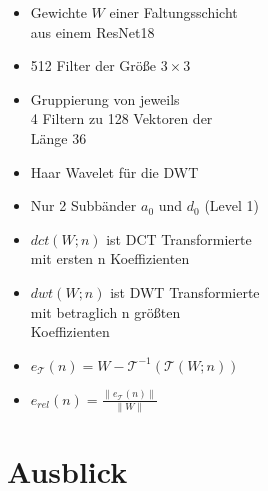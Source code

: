 \documentclass[aspectratio=169, 12pt]{beamer}
\begin{document}
\begin{frame}
  \begin{figure}
    \vspace{-0.8cm}
    \resizebox{7.8cm}{!}{%
      
    }
  \end{figure}
  \leavevmode
  \begin{itemize}
    \item Gewichte $W$ einer Faltungsschicht \\ aus einem ResNet18
    \item 512 Filter der Größe $3 \times 3$
    \item Gruppierung von jeweils \\ 4 Filtern zu 128 Vektoren der \\ Länge 36
    \item Haar Wavelet für die DWT
    \item Nur 2 Subbänder $a_0$ und $d_0$ (Level 1)
  \end{itemize}
\end{frame}

\begin{frame}
  \begin{figure}
    \vspace{-0.8cm}
    \resizebox{7.8cm}{!}{%
      
    }
  \end{figure}
  \leavevmode
  \begin{itemize}
    \item $dct(W; n)$ ist DCT Transformierte \\ mit ersten n Koeffizienten
    \item $dwt(W; n)$ ist DWT Transformierte \\ mit betraglich n größten \\ Koeffizienten
    \item $e_{\mathcal{T}}(n) = W - \mathcal{T}^{-1}(\mathcal{T}(W; n))$
    \item $e_{rel}(n) = \frac{\lVert e_{\mathcal{T}}(n) \rVert}{\lVert W \rVert}$
  \end{itemize}
\end{frame}

\section{Ausblick}
\end{document}
